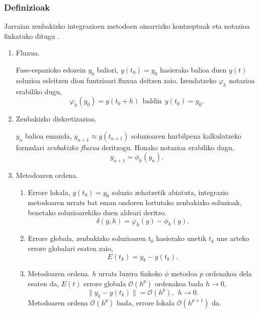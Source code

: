 \subsubsection*{Definizioak}  
Jarraian zenbakizko integrazioen metodoen oinarrizko kontzeptuak eta notazioa finkatuko ditugu \cite{Corless2013,Hairer2006}.
\begin{enumerate}
\item Fluxua.

Fase-espazioko edozein $y_0$ baliori, $y(t_0)=y_0$ hasierako balioa duen $y(t)$ soluzioa esleitzen dion funtzioari fluxua deitzen zaio. Izendatzeko $\varphi_h$ notazioa erabiliko dugu,
\begin{equation*}
\label{eq:fluxua}
\varphi_h(y_0)=y(t_0+h) \ \ \mbox{baldin}  \ \  y(t_0)=y_0.
\end{equation*}

\item Zenbakizko diskretizazioa.

$y_{n}$ balioa emanda, $y_{n+1}\approx y(t_{n+1})$ soluzioaren hurbilpena kalkulatzeko formulari \emph{zenbakizko fluxua} deritzogu. Honako notazioa erabiliko dugu,
\begin{equation}
\label{eq:204}
y_{n+1}=\phi_h(y_{n}).
\end{equation}

\item Metodoaren ordena.

\begin{enumerate}
\item Errore lokala,  $y(t_0)=y_0$ soluzio zehatzetik abiatuta, integrazio metodoaren urrats bat eman ondoren lortutako zenbakizko soluzioak, benetako soluzioarekiko duen aldeari deritzo.
\begin{equation*}
\label{eq:le}
\delta(y,h)=\varphi_h(y)-\phi_h(y).
\end{equation*}   


\item Errore globala, zenbakizko soluzioaren $t_0$ hasierako unetik $t_k$ une arteko errore globalari esaten zaio,
\begin{equation*}
 \label{eq:ge}
E(t_k)=y_k-y(t_k).
\end{equation*}  

\item Metodoaren ordena. $h$ urrats luzera finkoko $\phi$ metodoa $p$ ordenakoa dela esaten da, $E(t)$ errore globala $\mathcal{O}(h^{p})$ ordenakoa bada  $h \rightarrow 0$,
\begin{equation*} 
\label{eq:metordena}
\|y_k-y(t_k)\|=\mathcal{O}(h^{p}), \ \ h \rightarrow 0.
\end{equation*} 
Metodoaren ordena $\mathcal{O}(h^p)$ bada, errore lokala $\mathcal{O}(h^{p+1})$ da.


\end{enumerate}
\end{enumerate}
